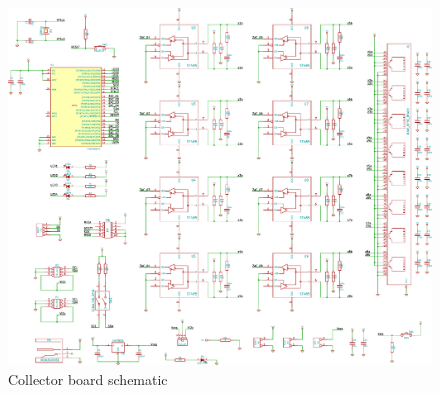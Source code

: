 \documentclass[a4paper]{scrreprt}
\begin{document}
\begin{appendices}
\begin{figure}
	\includegraphics[width=1\textwidth]{img/schem_collector_board.pdf}
	\caption{Collector board schematic}
	\label{fig:schem_collect}
\end{figure}

\end{appendices}
\end{document}
